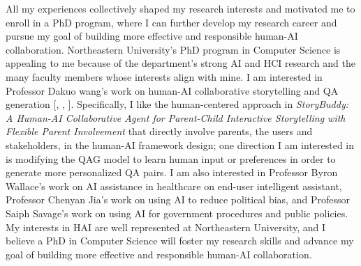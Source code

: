 

All my experiences collectively shaped my research interests and motivated me to enroll in a PhD program, where I can further develop my research career and pursue my goal of building more effective and responsible human-AI collaboration. 
Northeastern University's PhD program in Computer Science is appealing to me because of the department's strong AI and HCI research and the many faculty members whose interests align with mine. 
I am interested in Professor Dakuo wang's work on human-AI collaborative storytelling and QA generation [, , ]. Specifically, I like the human-centered approach in \textit{StoryBuddy: A Human-AI Collaborative Agent for Parent-Child Interactive Storytelling with Flexible Parent Involvement} that directly involve parents, the users and stakeholders, in the human-AI framework design; one direction I am interested in is modifying the QAG model to learn human input or preferences in order to generate more personalized QA pairs.
I am also interested in Professor Byron Wallace's work on AI assistance in healthcare on end-user intelligent assistant, Professor Chenyan Jia's work on using AI to reduce political bias, and Professor Saiph Savage's work on using AI for government procedures and public policies.
My interests in HAI are well represented at Northeastern University, and I believe a PhD in Computer Science will foster my research skills and advance my goal of building more effective and responsible human-AI collaboration.
